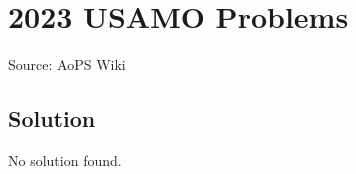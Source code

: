 \documentclass[12pt]{article}
\begin{document}
\section*{{2023 USAMO Problems}}
Source: AoPS Wiki

\subsection*{Solution}
No solution found.
\end{document}
